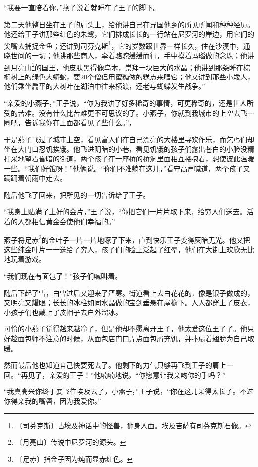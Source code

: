 \documentclass[12pt,UTF-8,openany]{ctexbook}
\begin{document}
\begin{normalsize}
    “我要一直陪着你，”燕子说着就睡在了王子的脚下。
    
    第二天他整日坐在王子的肩头上，给他讲自己在异国他乡的所见所闻和种种经历。他还给王子讲那些红色的朱鹭，它们排成长长的一行站在尼罗河的岸边，用它们的尖嘴去捕捉金鱼；还讲到司芬克斯\footnote{〔司芬克斯〕古埃及神话中的怪兽，狮身人面。埃及吉萨有司芬克斯石像。}，它的岁数跟世界一样长久，住在沙漠中，通晓世间的一切；他讲那些商人，牵着骆驼缓缓而行，手中摸着玛瑙做的念珠；他讲到月亮山\footnote{〔月亮山〕传说中尼罗河的源头。}的国王，他皮肤黑得像乌木，崇拜一块巨大的水晶；他讲到那条睡在棕榈树上的绿色大蟒蛇，要20个僧侣用蜜糖做的糕点来喂它；他又讲到那些小矮人，他们乘坐扁平的大树叶在湖泊中往来横渡，还老与蝴蝶发生战争。”
    
    “亲爱的小燕子，”王子说，“你为我讲了好多稀奇的事情，可更稀奇的，还是世人所受的苦难。没有什么比苦难更不可思议的了。小燕子，你就到我城市的上空去飞一圈吧，告诉我你在上面都看见了些什么。”，
    
    于是燕子飞过了城市上空，看见富人们在自己漂亮的大楼里寻欢作乐，而乞丐们却坐在大门口忍饥挨饿。他飞进阴暗的小巷，看见饥饿的孩子们露出苍白的小脸没精打采地望着昏暗的街道，两个孩子在一座桥的桥洞里面相互搂抱着，想使彼此温暖一些。“我们好饿呀！”他俩说。“你们不准躺在这儿，”看守高声喊道，两个孩子又蹒跚着朝雨中走去。
    
    随后他飞了回来，把所见的一切告诉给了王子。
    
    “我身上贴满了上好的金片，”王子说，“你把它们一片片取下来，给穷人们送去。活着的人都相信黄金会使他们幸福的。”
    
    燕子将足赤\footnote{〔足赤〕指金子因为纯而显赤红色。}的金叶子一片一片地啄了下来，直到快乐王子变得灰暗无光。他又把这些纯金叶片一一送给了穷人，孩子们的脸上泛起了红晕，他们在大街上欢欣无比地玩着游戏。
    
    “我们现在有面包了！”孩子们喊叫着。
    
    随后下起了雪，白雪过后又迎来了严寒。街道看上去白花花的，像是银子做成的，又明亮又耀眼；长长的冰柱如同水晶做的宝剑垂悬在屋檐下。人人都穿上了皮衣，小孩子们也戴上了皮帽子去户外溜冰。
    
    可怜的小燕子觉得越来越冷了，但是他却不愿离开王子，他太爱这位王子了。他只好趁面包师不注意的时候，从面包店门口弄点面包屑充饥，并扑扇着翅膀为自己取暖。
    
    然而最后他也知道自己快要死去了。他剩下的力气只够再飞到王子的肩上一回。“再见了，亲爱的王子！”他喃喃地说，“你愿意让我亲吻你的手吗？”
    
    “我真高兴你终于要飞往埃及去了，小燕子，”王子说，“你在这儿呆得太长了。不过你得亲我的嘴唇，因为我爱你。”
    

\end{normalsize}
\end{document}

